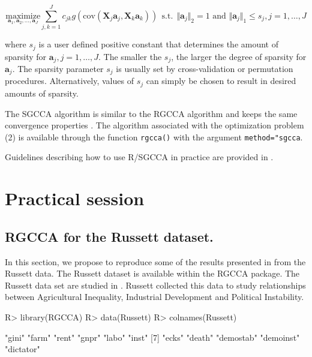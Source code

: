 \documentclass[
]{jss}
\begin{document}
\begin{equation}
\displaystyle \underset{\mathbf{a}_1,\mathbf{a}_2, \ldots,\mathbf{a}_J}{\text{maximize}} \sum_{j, k = 1}^J c_{jk}g(\mathrm{cov}(\mathbf{X}_j\ensuremath{\mathbf{a}}_j, \mathbf{X}_k\ensuremath{\mathbf{a}}_k)) \mathrm{~~s.t.~~} \Vert \mathbf{a}_j \Vert_2 = 1 \text{~and~} \Vert \mathbf{a}_j \Vert_1 \le s_j, j=1,\ldots,J
\label{optim_SGCCA}
\end{equation}

where \(s_j\) is a user defined positive constant that determines the
amount of sparsity for \(\ensuremath{\mathbf{a}}_j, j=1, \ldots,J\). The
smaller the \(s_j\), the larger the degree of sparsity for
\(\ensuremath{\mathbf{a}}_j\). The sparsity parameter \(s_j\) is usually
set by cross-validation or permutation procedures. Alternatively, values
of \(s_j\) can simply be chosen to result in desired amounts of
sparsity.

The SGCCA algorithm is similar to the RGCCA algorithm and keeps the same
convergence properties \citep{Tenenhaus2014b}. The algorithm associated
with the optimization problem (2) is available through the function
\texttt{rgcca()} with the argument \texttt{method="sgcca}.

Guidelines describing how to use R/SGCCA in practice are provided in
\citep{Garali2018}.

\hypertarget{practical-session}{%
\section{Practical session}\label{practical-session}}

\hypertarget{rgcca-for-the-russett-dataset.}{%
\subsection{RGCCA for the Russett
dataset.}\label{rgcca-for-the-russett-dataset.}}

In this section, we propose to reproduce some of the results presented
in \citep{Tenenhaus2011} from the Russett data. The Russett dataset is
available within the RGCCA package. The Russett data set
\citep{Russett1964} are studied in \citep{Gifi1990}. Russett collected
this data to study relationships between Agricultural Inequality,
Industrial Development and Political Instability.

\footnotesize

\begin{CodeChunk}
\begin{CodeInput}
R> library(RGCCA)
R> data(Russett)
R> colnames(Russett)
\end{CodeInput}
\begin{CodeOutput}
 [1] "gini"     "farm"     "rent"     "gnpr"     "labo"     "inst"    
 [7] "ecks"     "death"    "demostab" "demoinst" "dictator"
\end{CodeOutput}
\end{CodeChunk}
\end{document}

